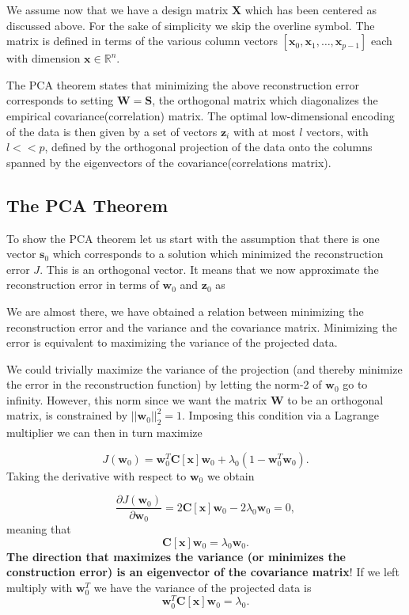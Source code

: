\documentclass[%
oneside,                 %
final,                   %
10pt]{article}
\begin{document}
We assume now that we have a design matrix $\bm{X}$ which has been
centered as discussed above. For the sake of simplicity we skip the
overline symbol. The matrix is defined in terms of the various column
vectors $[\bm{x}_0,\bm{x}_1,\dots, \bm{x}_{p-1}]$ each with dimension
$\bm{x}\in {\mathbb{R}}^{n}$.

The PCA theorem states that minimizing the above reconstruction error
corresponds to setting $\bm{W}=\bm{S}$, the orthogonal matrix which
diagonalizes the empirical covariance(correlation) matrix. The optimal
low-dimensional encoding of the data is then given by a set of vectors
$\bm{z}_i$ with at most $l$ vectors, with $l << p$, defined by the
orthogonal projection of the data onto the columns spanned by the
eigenvectors of the covariance(correlations matrix).

\subsection{The PCA Theorem}

To show the PCA theorem let us start with the assumption that there is one vector $\bm{s}_0$ which corresponds to a solution which minimized the reconstruction error $J$. This is an orthogonal vector. It means that we now approximate the reconstruction error in terms of $\bm{w}_0$ and $\bm{z}_0$ as

We are almost there, we have obtained a relation between minimizing
the reconstruction error and the variance and the covariance
matrix. Minimizing the error is equivalent to maximizing the variance
of the projected data.

We could trivially maximize the variance of the projection (and
thereby minimize the error in the reconstruction function) by letting
the norm-2 of $\bm{w}_0$ go to infinity. However, this norm since we
want the matrix $\bm{W}$ to be an orthogonal matrix, is constrained by
$\vert\vert \bm{w}_0 \vert\vert_2^2=1$. Imposing this condition via a
Lagrange multiplier we can then in turn maximize

\[
J(\bm{w}_0)= \bm{w}_0^T\bm{C}[\bm{x}]\bm{w}_0+\lambda_0(1-\bm{w}_0^T\bm{w}_0).
\]
Taking the derivative with respect to $\bm{w}_0$ we obtain

\[
\frac{\partial J(\bm{w}_0)}{\partial \bm{w}_0}= 2\bm{C}[\bm{x}]\bm{w}_0-2\lambda_0\bm{w}_0=0,
\]
meaning that
\[
\bm{C}[\bm{x}]\bm{w}_0=\lambda_0\bm{w}_0.
\]
\textbf{The direction that maximizes the variance (or minimizes the construction error) is an eigenvector of the covariance matrix}! If we left multiply with $\bm{w}_0^T$ we have the variance of the projected data is
\[
\bm{w}_0^T\bm{C}[\bm{x}]\bm{w}_0=\lambda_0.
\]
\end{document}
